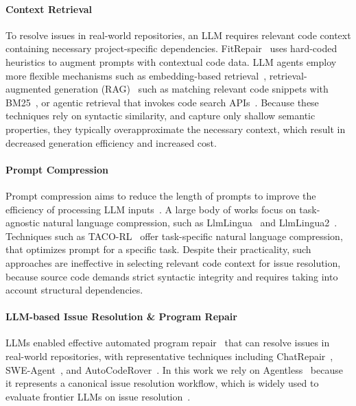 \documentclass[sigconf,nonacm]{acmart}
\begin{document}
\paragraph*{Context Retrieval} To resolve issues in real-world repositories, an LLM requires relevant code context containing necessary project-specific dependencies. FitRepair~\cite{xia2023plastic} uses hard-coded heuristics to augment prompts with contextual code data. LLM agents employ more flexible mechanisms such as embedding-based retrieval~\cite{xia2024agentless}, retrieval-augmented generation (RAG)~\cite{lewis2020retrieval} such as matching relevant code snippets with BM25~\cite{robertson2009probabilistic}, or agentic retrieval that invokes code search APIs~\cite{zhang2024autocoderover}. Because these techniques rely on syntactic similarity, and capture only shallow semantic properties, they typically overapproximate the necessary context, which result in decreased generation efficiency and increased cost.

\paragraph*{Prompt Compression} Prompt compression aims to reduce the length of prompts to improve the efficiency of processing LLM inputs~\cite{li2025prompt,wan2023efficient}. A large body of works focus on task-agnostic natural language compression, such as LlmLingua~\cite{jiang2023llmlingua} and LlmLingua2~\cite{pan2024llmlingua}. Techniques such as TACO-RL~\cite{shandilya2025taco} offer task-specific natural language compression, that optimizes prompt for a specific task. Despite their practicality, such approaches are ineffective in selecting relevant code context for issue resolution, because source code demands strict syntactic integrity and requires taking into account structural dependencies.

\paragraph*{LLM-based Issue Resolution \& Program Repair} LLMs enabled effective automated program repair~\cite{le2019automated} that can resolve issues in real-world repositories, with representative techniques including ChatRepair~\cite{xia2024automated}, SWE-Agent~\cite{DBLP:conf/nips/YangJWLYNP24}, and AutoCodeRover~\cite{zhang2024autocoderover}. In this work we rely on Agentless~\cite{xia2024agentless} because it represents a canonical issue resolution workflow, which is widely used to evaluate frontier LLMs on issue resolution~\cite{deng2025swe}.
\end{document}
